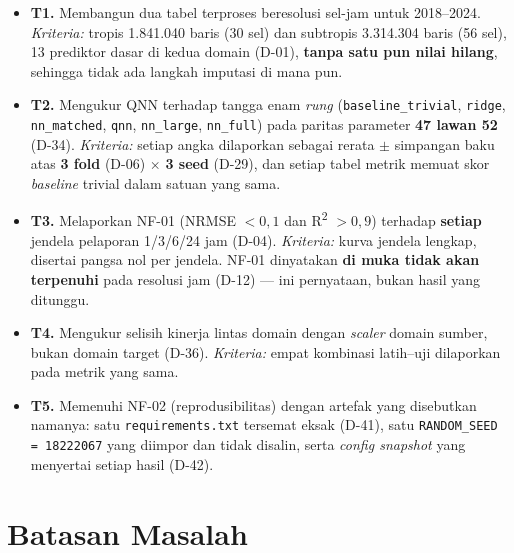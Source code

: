 \begin{itemize}
    \item \textbf{T1.} Membangun dua tabel terproses beresolusi sel-jam untuk
          2018--2024. \textit{Kriteria:} tropis 1.841.040 baris (30 sel) dan
          subtropis 3.314.304 baris (56 sel), 13 prediktor dasar di kedua
          domain (D-01), \textbf{tanpa satu pun nilai hilang}, sehingga tidak
          ada langkah imputasi di mana pun.
    \item \textbf{T2.} Mengukur QNN terhadap tangga enam \textit{rung}
          (\texttt{baseline\_trivial}, \texttt{ridge}, \texttt{nn\_matched},
          \texttt{qnn}, \texttt{nn\_large}, \texttt{nn\_full}) pada paritas
          parameter \textbf{47 lawan 52} (D-34). \textit{Kriteria:} setiap
          angka dilaporkan sebagai rerata $\pm$ simpangan baku atas
          \textbf{3 fold} (D-06) $\times$ \textbf{3 seed} (D-29), dan setiap
          tabel metrik memuat skor \textit{baseline} trivial dalam satuan yang
          sama.
    \item \textbf{T3.} Melaporkan NF-01 (NRMSE $< 0,1$ dan R\textsuperscript{2}
          $> 0,9$) terhadap \textbf{setiap} jendela pelaporan 1/3/6/24 jam
          (D-04). \textit{Kriteria:} kurva jendela lengkap, disertai pangsa nol
          per jendela. NF-01 dinyatakan \textbf{di muka tidak akan terpenuhi}
          pada resolusi jam (D-12) — ini pernyataan, bukan hasil yang ditunggu.
    \item \textbf{T4.} Mengukur selisih kinerja lintas domain dengan
          \textit{scaler} domain sumber, bukan domain target (D-36).
          \textit{Kriteria:} empat kombinasi latih--uji dilaporkan pada metrik
          yang sama.
    \item \textbf{T5.} Memenuhi NF-02 (reprodusibilitas) dengan artefak yang
          disebutkan namanya: satu \texttt{requirements.txt} tersemat eksak
          (D-41), satu \texttt{RANDOM\_SEED = 18222067} yang diimpor dan tidak
          disalin, serta \textit{config snapshot} yang menyertai setiap hasil
          (D-42).
\end{itemize}

\section{Batasan Masalah}

